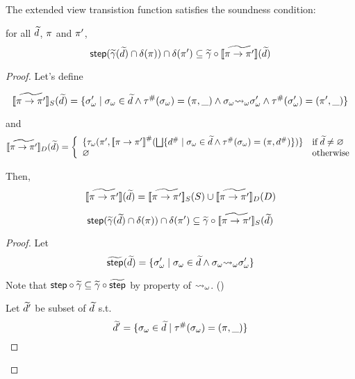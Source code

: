 \begin{theorem}
  The extended view transistion function satisfies the soundness condition:
  
  for all $\widetilde{d}$, $\pi$ and $\pi'$,
  \[
    \textsf{step}(\widetilde{\gamma}(\widetilde{d}) \cap \delta(\pi))
    \cap \delta(\pi') \subseteq \widetilde{\gamma} \circ
    [\![{\widetilde{\pi \rightarrow \pi'}}]\!](\widetilde{d})
  \]
\end{theorem}

\begin{proof}

Let's define

\[
  [\![{\widetilde{\pi \rightarrow \pi'}}]\!]_S(\widetilde{d}) = \{
      {\sigma}_\omega' \mid {\sigma}_\omega \in \widetilde{d} \wedge
      {\tau}^{\#}({\sigma}_\omega) = (\pi, \_) \wedge
      {\sigma}_\omega {\leadsto}_\omega {\sigma}_\omega' \wedge
      {\tau}^{\#}({\sigma}_\omega') = (\pi', \_)
    \}
\]

and
\[
  [\![{\widetilde{\pi \rightarrow \pi'}}]\!]_D(\widetilde{d}) = 
  \left\{
    \begin{array}{ll}
      \{ {\tau}_\omega(\pi', {[\![{\pi \rightarrow \pi'}]\!]}^{\#}(\bigsqcup \{
        {d}^{\#} \mid {\sigma}_\omega \in \widetilde{d} \wedge {\tau}^{\#}({\sigma}_\omega) = (\pi, {d}^{\#}) \}) \}
      & \text{if} \; \widetilde{d} \neq \varnothing\\
      \varnothing & \text{otherwise}\\
    \end{array}
    \right.
\]

Then,
\[
  [\![{\widetilde{\pi \rightarrow \pi'}}]\!](\widetilde{d}) =
  [\![{\widetilde{\pi \rightarrow \pi'}}]\!]_S(S) \cup
  [\![{\widetilde{\pi \rightarrow \pi'}}]\!]_D(D)
\]

\begin{lemma}
\[
  \textsf{step}(\widetilde{\gamma}(\widetilde{d}) \cap \delta(\pi))
  \cap \delta(\pi') \subseteq \widetilde{\gamma} \circ
  [\![{\widetilde{\pi \rightarrow \pi'}}]\!]_S(\widetilde{d})
\]
\end{lemma}

\begin{proof}

Let
\[
  \widetilde{\textsf{step}}(\widetilde{d}) = \{
      {\sigma}_\omega' \mid {\sigma}_\omega \in \widetilde{d} \wedge
      {\sigma}_\omega {\leadsto}_\omega {\sigma}_\omega'
    \}
\]

Note that 
$\textsf{step} \circ \widetilde{\gamma} \subseteq \widetilde{\gamma} \circ \widetilde{\textsf{step}}$
by property of ${\leadsto}_\omega$. (\todo)

\bigskip

Let $\widetilde{d}'$ be subset of $\widetilde{d}$ s.t.
\[
  \widetilde{d}' = \{
      {\sigma}_\omega \in \widetilde{d} \mid
      {\tau}^{\#}({\sigma}_\omega) = (\pi, \_)
    \}
\]


\end{proof}
\end{proof}

